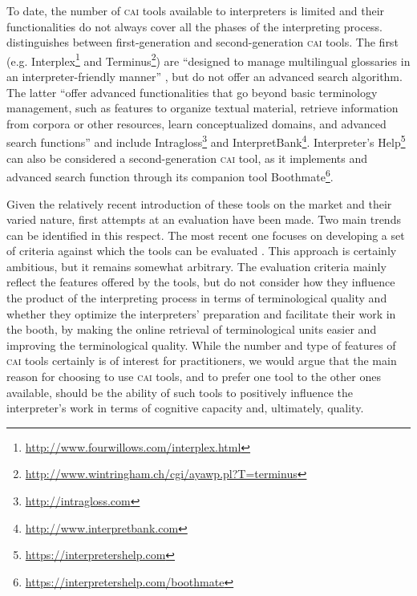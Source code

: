 \documentclass[output=paper]{langsci/langscibook}
\begin{document}
To date, the number of \textsc{cai} tools available to interpreters is limited and their functionalities do not always cover all the phases of the interpreting process. \citet{Fantinuoli2018} distinguishes between first-generation and second-generation \textsc{cai} tools. The first (e.g. Interplex\footnote{\url{http://www.fourwillows.com/interplex.html}} and Terminus\footnote{\url{http://www.wintringham.ch/cgi/ayawp.pl?T=terminus}}) are ``designed to manage multilingual glossaries in an interpreter-friendly manner'' \citep[164]{Fantinuoli2018}, but do not offer an advanced search algorithm. The latter ``offer advanced functionalities that go beyond basic terminology management, such as features to organize textual material, retrieve information from corpora or other resources, learn conceptualized domains, and advanced search functions'' \citep[164]{Fantinuoli2018} and include Intragloss\footnote{\url{http://intragloss.com}} and InterpretBank\footnote{\url{http://www.interpretbank.com}}. Interpreter’s Help\footnote{\url{https://interpretershelp.com}} can also be considered a second-generation \textsc{cai} tool, as it implements and advanced search function through its companion tool Boothmate\footnote{\url{https://interpretershelp.com/boothmate}}. 

Given the relatively recent introduction of these tools on the market and their varied nature, first attempts at an evaluation have been made. Two main trends can be identified in this respect. The most recent one focuses on developing a set of criteria against which the tools can be evaluated \citep{Costa2016, Will2015}. This approach is certainly ambitious, but it remains somewhat arbitrary. The evaluation criteria mainly reflect the features offered by the tools, but do not consider how they influence the product of the interpreting process in terms of terminological quality and whether they optimize the interpreters’ preparation and facilitate their work in the booth, by making the online retrieval of terminological units easier and improving the terminological quality. While the number and type of features of \textsc{cai} tools certainly is of interest for practitioners, we would argue that the main reason for choosing to use \textsc{cai} tools, and to prefer one tool to the other ones available, should be the ability of such tools to positively influence the interpreter’s work in terms of cognitive capacity and, ultimately, quality. 
\end{document}
